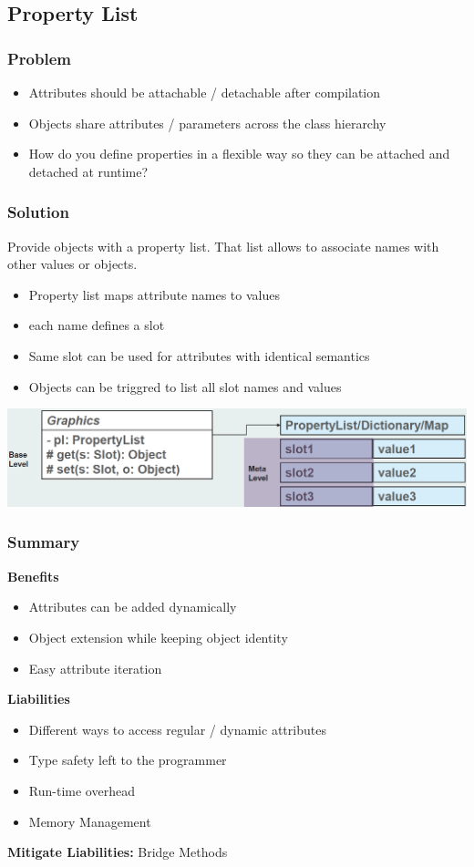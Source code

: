 \subsection{Property List}
\subsubsection{Problem}
\begin{itemize}
    \item Attributes should be attachable / detachable after compilation
    \item Objects share attributes / parameters across the class hierarchy
    \item How do you define properties in a flexible way so they can be attached and detached at runtime?
\end{itemize}
\subsubsection{Solution}
Provide objects with a property list. That list allows to associate names with other values or objects.
\begin{itemize}
    \item Property list maps attribute names to values
    \item each name defines a slot
    \item Same slot can be used for attributes with identical semantics
    \item Objects can be triggred to list all slot names and values
\end{itemize}
\includegraphics[width=\linewidth]{./img/property_list.png}
\subsubsection{Summary}
\textbf{Benefits}
\begin{itemize}
    \item Attributes can be added dynamically
    \item Object extension while keeping object identity
    \item Easy attribute iteration
\end{itemize}
\textbf{Liabilities}
\begin{itemize}
    \item Different ways to access regular / dynamic attributes
    \item Type safety left to the programmer
    \item Run-time overhead
    \item Memory Management
\end{itemize}
\textbf{Mitigate Liabilities:} Bridge Methods

